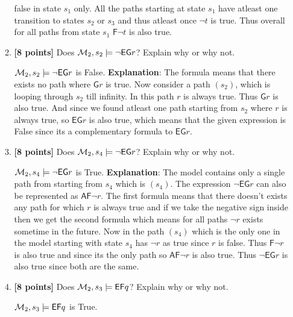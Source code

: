 \documentclass{article}
\def\Sometime{\mathord{\mathsf{F}}}
\def\Forever{\mathord{\mathsf{G}}}
\def\All{\mathord{\mathsf{A}}}
\def\Exists{\mathord{\mathsf{E}}}
\begin{document}
\begin{itemize}
\begin{enumerate}
\begin{answer}
    	false in state $s_1$ only. All the paths starting at state $s_1$ have
    	atleast one transition to states $s_2$ or $s_3$ and thus atleast once
    	$\neg t$ is true. Thus overall for all paths from state $s_1$ $\Sometime
    	\neg t$ is also true.
    \end{answer}
    \bigskip
  \item \textbf{[8 points]} Does ${\cal M}_2, s_2 \models \neg \Exists
    \Forever r$?  Explain why or why not.
    \begin{answer}
    	${\cal M}_2, s_2 \models \neg \Exists \Forever r$ is False. \newline
    	\textbf{Explanation}: The formula means that there exists no path where
    	$\Forever r$ is true. Now consider a path $(s_2)$, which is looping through
    	$s_2$ till infinity. In this path $r$ is always true. Thus $\Forever r$ is
    	also true. And since we found atleast one path starting from $s_2$ where
    	$r$ is always true, so $\Exists \Forever r$ is also true, which means that
    	the given expression is False since its a complementary formula to
    	$\Exists \Forever r$.
    \end{answer}
    \bigskip
  \item \textbf{[8 points]} Does ${\cal M}_2, s_4 \models \neg \Exists
    \Forever r$?  Explain why or why not.
    \begin{answer}
    	${\cal M}_2, s_4 \models \neg \Exists \Forever r$ is True.	\newline
    	\textbf{Explanation}: The model contains only a single path from starting
    	from $s_4$ which is $(s_4)$. The expression $\neg \Exists \Forever r$ can
    	also be represented as $\All \Sometime \neg r$. The first formula means
    	that there doesn't exists any path for which $r$ is always true and if we
    	take the negative sign inside then we get the second formula which means
    	for all paths $\neg r$ exists sometime in the future. Now in the path
    	$(s_4)$ which is the only one in the model starting with state $s_4$ has
    	$\neg r$ as true since $r$ is false. Thus $\Sometime \neg r$ is also true
    	and since its the only path so $\All \Sometime \neg r$ is also true. Thus
    	$\neg \Exists \Forever r$ is also true since both are the same.
    \end{answer}
    \bigskip
  \item \textbf{[8 points]} Does ${\cal M}_2, s_3 \models \Exists
    \Sometime q$?  Explain why or why not.
    \begin{answer}
    	${\cal M}_2, s_3 \models \Exists \Sometime q$ is True.	\newline

\end{answer}
\end{enumerate}
\end{itemize}
\end{document}
